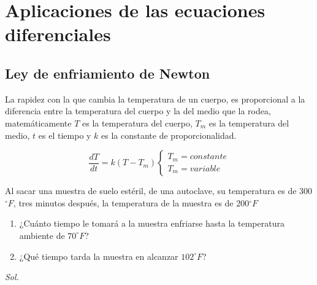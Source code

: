 \section{Aplicaciones de las ecuaciones diferenciales}

\subsection{Ley de enfriamiento de Newton}

La rapidez con la que cambia la temperatura de un cuerpo, es proporcional a la diferencia entre la temperatura del cuerpo y la del medio que la rodea, matemáticamente $T$ es la temperatura del cuerpo, $T_m$ es la temperatura del medio, $t$ es el tiempo y $k$ es la constante de proporcionalidad.

\begin{equation}
    \frac{d T}{d t}=k \left( T-T_m \right)\begin{cases}
        T_m=constante\\
        T_m=variable
    \end{cases}
\end{equation}

\begin{example}
    Al sacar una muestra de suelo estéril, de una autoclave, su temperatura es de 300$^{\circ}F$, tres minutos después, la temperatura de la muestra es de 200$^{\circ}F$
    \begin{enumerate}
        \item ¿Cuánto tiempo le tomará a la muestra enfriarse hasta la temperatura ambiente de $70^{\circ}F$?
        \item ¿Qué tiempo tarda la muestra en alcanzar $102^{\circ}F$?
    \end{enumerate}
\end{example}

\textit{ Sol. }

